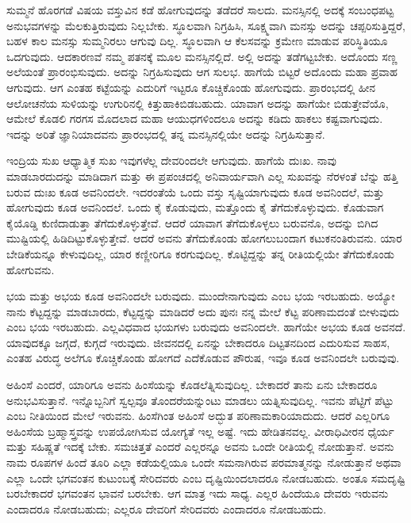 ಸುಮ್ಮನೆ ಹೊರಗಡೆ ವಿಷಯ ವಸ್ತುವಿನ ಕಡೆ ಹೋಗುವುದನ್ನು ತಡೆದರೆ ಸಾಲದು. ಮನಸ್ಸಿನಲ್ಲಿ ಅದಕ್ಕೆ ಸಂಬಂಧಪಟ್ಟ ಅನುಭವಗಳನ್ನು ಮೆಲಕುತ್ತಿರುವುದು ನಿಲ್ಲಬೇಕು. ಸ್ಥೂಲವಾಗಿ ನಿಗ್ರಹಿಸಿ, ಸೂಕ್ಷ್ಮವಾಗಿ ಮನಸ್ಸು ಅದನ್ನು ಚಪ್ಪರಿಸುತ್ತಿದ್ದರೆ, ಬಹಳ ಕಾಲ ಮನಸ್ಸು ಸುಮ್ಮನಿರಲು ಆಗುವು ದಿಲ್ಲ. ಸ್ಥೂಲವಾಗಿ ಆ ಕೆಲಸವನ್ನು ಕ್ರಮೇಣ ಮಾಡುವ ಪರಿಸ್ಥಿತಿಯೂ ಒದಗುವುದು. ಆದಕಾರಣವೆ ನಮ್ಮ ಪತನಕ್ಕೆ ಮೂಲ ಮನಸ್ಸಿನಲ್ಲಿದೆ. ಅಲ್ಲಿ ಅದನ್ನು ತಡೆಗಟ್ಟಬೇಕು. ಅದೊಂದು ಸಣ್ಣ ಅಲೆಯಂತೆ ಪ್ರಾರಂಭಿಸುವುದು. ಅದನ್ನು ನಿಗ್ರಹಿಸುವುದು ಆಗ ಸುಲಭ. ಹಾಗೆಯೆ ಬಿಟ್ಟರೆ ಅದೊಂದು ಮಹಾ ಪ್ರವಾಹ ಆಗುವುದು. ಆಗ ಎಂತಹ ಕಟ್ಟೆಯನ್ನು ಎದುರಿಗೆ ಇಟ್ಟರೂ ಕೊಚ್ಚಿಕೊಂಡು ಹೋಗುವುದು. ಪ್ರಾರಂಭದಲ್ಲಿ ಹೀನ ಆಲೋಚನೆಯ ಸುಳಿಯನ್ನು ಉಗುರಿನಲ್ಲಿ ಕಿತ್ತುಹಾಕಿಬಿಡಬಹುದು. ಯಾವಾಗ ಅದನ್ನು ಹಾಗೆಯೇ ಬಿಡುತ್ತೇವೆಯೊ, ಆಮೇಲೆ ಕೊಡಲಿ ಗರಗಸ ಮೊದಲಾದ ಮಹಾ ಆಯುಧಗಳಿಂದಲೂ ಅದನ್ನು ಕಡಿದು ಹಾಕಲು ಕಷ್ಟವಾಗುವುದು. ಇದನ್ನು ಅರಿತೆ ಜ್ಞಾನಿಯಾದವನು ಪ್ರಾರಂಭದಲ್ಲಿ ತನ್ನ ಮನಸ್ಸಿನಲ್ಲಿಯೇ ಅದನ್ನು ನಿಗ್ರಹಿಸುತ್ತಾನೆ. 

ಇಂದ್ರಿಯ ಸುಖ ಆಧ್ಯಾತ್ಮಿಕ ಸುಖ ಇವುಗಳೆಲ್ಲ ದೇವರಿಂದಲೇ ಆಗುವುದು. ಹಾಗೆಯೆ ದುಃಖ. ನಾವು ಮಾಡಬಾರದುದನ್ನು ಮಾಡಿದಾಗ ಮತ್ತು ಈ ಪ್ರಪಂಚದಲ್ಲಿ ಅನಿವಾರ್ಯವಾಗಿ ಎಲ್ಲ ಸುಖವನ್ನು ನೆರಳಂತೆ ಬೆನ್ನು ಹತ್ತಿ ಬರುವ ದುಃಖ ಕೂಡ ಅವನಿಂದಲೇ. ಇದರಂತೆಯೆ ಒಂದು ವಸ್ತು ಸೃಷ್ಟಿಯಾಗುವುದು ಕೂಡ ಅವನಿಂದಲೆ, ಮತ್ತು ಹೋಗುವುದು ಕೂಡ ಅವನಿಂದಲೆ. ಒಂದು ಕೈ ಕೊಡುವುದು, ಮತ್ತೊಂದು ಕೈ ತೆಗೆದುಕೊಳ್ಳುವುದು. ಕೊಡುವಾಗ ಕೈಯೊಡ್ಡಿ ಕುಣಿದಾಡುತ್ತಾ ತೆಗೆದುಕೊಳ್ಳುತ್ತೇವೆ. ಆದರೆ ಯಾವಾಗ ತೆಗೆದುಕೊಳ್ಳಲು ಬರುವನೊ, ಅದನ್ನು ಬಿಗಿದ ಮುಷ್ಟಿಯಲ್ಲಿ ಹಿಡಿದಿಟ್ಟುಕೊಳ್ಳುತ್ತೇವೆ. ಆದರೆ ಅವನು ತೆಗೆದುಕೊಂಡು ಹೋಗಲು\break ಬಂದಾಗ ಕಟುಕನಂತಿರುವನು. ಯಾರ ಬೇಡಿಕೆಯನ್ನೂ ಕೇಳುವುದಿಲ್ಲ, ಯಾರ ಕಣ್ಣೀರಿಗೂ ಕರಗುವುದಿಲ್ಲ. ಕೊಟ್ಟಿದ್ದನ್ನು ತನ್ನ ರೀತಿಯಲ್ಲಿಯೇ ತೆಗೆದುಕೊಂಡು ಹೋಗುವನು.

ಭಯ ಮತ್ತು ಅಭಯ ಕೂಡ ಅವನಿಂದಲೇ ಬರುವುದು. ಮುಂದೇನಾಗುವುದು ಎಂಬ ಭಯ ಇರಬಹುದು. ಅಯ್ಯೋ ನಾನು ಕೆಟ್ಟದ್ದನ್ನು ಮಾಡಬಾರದು, ಕೆಟ್ಟದ್ದನ್ನು ಮಾಡಿದರೆ ಅದು ಪುನಃ ನನ್ನ ಮೇಲೆ ಕೆಟ್ಟ ಪರಿಣಾಮದಂತೆ ಬೀಳುವುದು ಎಂಬ ಭಯ ಇರಬಹುದು. ಎಲ್ಲ\break ವಿಧವಾದ ಭಯಗಳು ಬರುವುದು ಅವನಿಂದಲೇ. ಹಾಗೆಯೇ ಅಭಯ ಕೂಡ ಅವನದೆ. ಯಾವುದಕ್ಕೂ ಜಗ್ಗದೆ, ಕುಗ್ಗದೆ ಇರುವುದು. ಜೀವನದಲ್ಲಿ ಏನನ್ನು ಬೇಕಾದರೂ ದಿಟ್ಟತನದಿಂದ ಎದುರಿಸುವ ಸಾಹಸ, ಎಂತಹ ವಿರುದ್ಧ ಅಲೆಗೂ ಕೊಚ್ಚಿಕೊಂಡು ಹೋಗದೆ ಎದೆಕೊಡುವ ಪೌರುಷ, ಇವೂ ಕೂಡ ಅವನಿಂದಲೇ ಬರುವುವು.

ಅಹಿಂಸೆ ಎಂದರೆ, ಯಾರಿಗೂ ಅವನು ಹಿಂಸೆಯನ್ನು ಕೊಡಲೆತ್ನಿಸುವುದಿಲ್ಲ. ಬೇಕಾದರೆ ತಾನು ಏನು ಬೇಕಾದರೂ ಅನುಭವಿಸುತ್ತಾನೆ. ಇನ್ನೊಬ್ಬನಿಗೆ ಸ್ವಲ್ಪವೂ ತೊಂದರೆಯನ್ನುಂಟು ಮಾಡಲು ಯತ್ನಿಸುವುದಿಲ್ಲ. ಇವನು ಪೆಟ್ಟಿಗೆ ಪೆಟ್ಟು ಎಂಬ ನೀತಿಯಿಂದ ಮೇಲೆ ಇರುವನು. ಹಿಂಸೆಗಿಂತ ಅಹಿಂಸೆ ಅದ್ಭುತ ಪರಿಣಾಮಕಾರಿಯಾದುದು. ಆದರೆ ಎಲ್ಲರಿಗೂ ಅಹಿಂಸೆಯ ಬ್ರಹ್ಮಾಸ್ತ್ರವನ್ನು ಉಪಯೋಗಿಸುವ ಯೋಗ್ಯತೆ ಇಲ್ಲ ಅಷ್ಟೆ. ಇದು ಹೇಡಿತನವಲ್ಲ. ವೀರಾಧಿವೀರನ ಧೈರ್ಯ ಮತ್ತು ಸಹಿಷ್ಣತೆ ಇದಕ್ಕೆ ಬೇಕು. ಸಮಚಿತ್ತತೆ ಎಂದರೆ ಎಲ್ಲರನ್ನೂ ಅವನು ಒಂದೇ ರೀತಿಯಲ್ಲಿ ನೋಡುತ್ತಾನೆ. ಅವನು ನಾಮ ರೂಪಗಳ ಹಿಂದೆ ತೂರಿ ಎಲ್ಲಾ ಕಡೆಯಲ್ಲಿಯೂ ಒಂದೇ ಸಮನಾಗಿರುವ ಪರಮಾತ್ಮನನ್ನು ನೋಡುತ್ತಾನೆ ಅಥವಾ ಎಲ್ಲಾ ಒಂದೇ ಭಗವಂತನ ಕುಟುಂಬಕ್ಕೆ ಸೇರಿದವರು ಎಂಬ ದೃಷ್ಟಿಯಿಂದಲಾದರೂ ನೋಡಬಹುದು. ಅಂತೂ ಸಮದೃಷ್ಟಿ ಬರಬೇಕಾದರೆ ಭಗವಂತನ ಭಾವನೆ ಬರಬೇಕು. ಆಗ ಮಾತ್ರ ಇದು ಸಾಧ್ಯ. ಎಲ್ಲರ ಹಿಂದೆಯೂ ದೇವರು ಇರುವನು ಎಂದಾದರೂ ನೋಡಬಹುದು; ಎಲ್ಲರೂ ದೇವರಿಗೆ ಸೇರಿದವರು ಎಂದಾದರೂ ನೋಡಬಹುದು.

